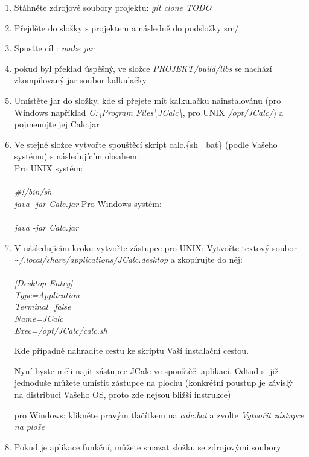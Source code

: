 \documentclass[a4paper, 11pt]{article}
\begin{document}
\begin{enumerate}
	\item Stáhněte zdrojové soubory projektu: \emph{git clone TODO}
	\item Přejděte do složky s projektem a následně do podsložky src/
	\item Spusťte cíl : \emph{make jar}
	\item pokud byl překlad úspěšný, ve složce \emph{PROJEKT/build/libs} se nachází zkompilovaný jar soubor kalkulačky
	\item Umístěte jar do složky, kde si přejete mít kalkulačku nainstalovánu (pro Windows například \emph{C:\textbackslash Program Files\textbackslash JCalc\textbackslash}, pro UNIX \emph{/opt/JCalc/}) a pojmenujte jej Calc.jar
	\item Ve stejné složce vytvořte spouštěcí skript calc.\{sh | bat\} (podle Vašeho systému) s následujícím obsahem:\\
		\subitem Pro UNIX systém:\\\\
			\emph{\#!/bin/sh\\
				java -jar Calc.jar}
		\subitem Pro Windows systém:\\\\
			\emph{java -jar Calc.jar}
			
	\item V následujícím kroku vytvořte zástupce
		\subitem pro UNIX:
			\subsubitem Vytvořte textový soubor \emph{\textasciitilde/.local/share/applications/JCalc.desktop} a zkopírujte do něj:\\\\
						\emph{
						[Desktop Entry]\\
						Type=Application\\
						Terminal=false\\
						Name=JCalc\\
						Exec=/opt/JCalc/calc.sh\\
						}

			\subsubitem Kde případně nahradíte cestu ke skriptu Vaší instalační cestou.
			
			\subsubitem Nyní byste měli najít zástupce JCalc ve spouštěči aplikací. Odtud si již jednoduše můžete umístit zástupce na plochu (konkrétní poustup je závislý na distribuci Vašeho OS, proto zde nejsou bližší instrukce)
		
		\subitem pro Windows:
			\subsubitem klikněte pravým tlačítkem na \emph{calc.bat} a zvolte \emph{Vytvořit zástupce na ploše}
			
			
	\item Pokud je aplikace funkční, můžete smazat složku se zdrojovými soubory
\end{enumerate}
\end{document}
